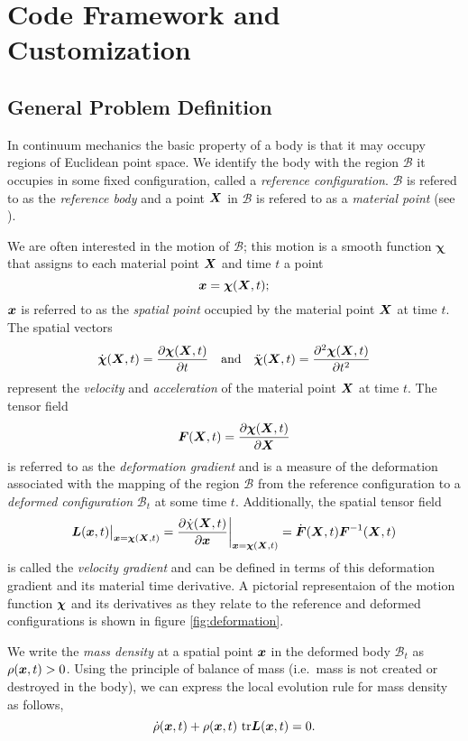 \chapter{Code Framework and Customization} \label{sec:code}
\section{General Problem Definition}
In continuum mechanics the basic property of a body is that it may occupy regions of Euclidean point space. We identify the body with the region $\mathcal{B}$ it occupies in some fixed configuration, called a \textit{reference configuration}. $\mathcal{B}$ is refered to as the \textit{reference body} and a point $\boldsymbol{X}$ in $\mathcal{B}$ is refered to as a \textit{material point} (see \cite{gurtin2010}).

We are often interested in the motion of $\mathcal{B}$; this motion is a smooth function $\boldsymbol{\chi}$ that assigns to each material point $\boldsymbol{X}$ and time $t$ a point
$$\boldsymbol{x} = \boldsymbol{\chi}(\boldsymbol{X},t);$$
$\boldsymbol{x}$ is referred to as the \textit{spatial point} occupied by the material point $\boldsymbol{X}$ at time $t$. The spatial vectors
$$\dot{\boldsymbol{\chi}}(\boldsymbol{X},t) = \frac{\partial \boldsymbol{\chi}(\boldsymbol{X},t)}{\partial t} \quad \text{and} \quad \ddot{\boldsymbol{\chi}}(\boldsymbol{X},t) = \frac{\partial^2 \boldsymbol{\chi}(\boldsymbol{X},t)}{\partial t^2}$$
represent the \textit{velocity} and \textit{acceleration} of the material point $\boldsymbol{X}$ at time $t$. The tensor field
$$\boldsymbol{F}(\boldsymbol{X},t) = \frac{\partial \boldsymbol{\chi}(\boldsymbol{X},t)}{\partial \boldsymbol{X}}$$
is referred to as the \textit{deformation gradient} and is a measure of the deformation associated with the mapping of the region $\mathcal{B}$ from the reference configuration to a \textit{deformed configuration} $\mathcal{B}_t$ at some time $t$. Additionally, the spatial tensor field
$$\boldsymbol{L}(\boldsymbol{x},t)\big|_{\boldsymbol{x}=\boldsymbol{\chi}(\boldsymbol{X},t)} = \frac{\partial \dot{\chi}(\boldsymbol{X},t)}{\partial \boldsymbol{x}}\bigg|_{\boldsymbol{x}=\boldsymbol{\chi}(\boldsymbol{X},t)}=\dot{\boldsymbol{F}}(\boldsymbol{X},t)\boldsymbol{F}^{-1}(\boldsymbol{X},t)$$
is called the \textit{velocity gradient} and can be defined in terms of this deformation gradient and its material time derivative. A pictorial representaion of the motion function $\boldsymbol{\chi}$ and its derivatives as they relate to the reference and deformed configurations is shown in figure \ref{fig:deformation}.

We write the \textit{mass density} at a spatial point $\boldsymbol{x}$ in the deformed body $\mathcal{B}_t$ as $\rho(\boldsymbol{x},t) > 0$. Using the principle of balance of mass (i.e.\ mass is not created or destroyed in the body), we can express the local evolution rule for mass density as follows,
$$\dot{\rho}(\boldsymbol{x},t) + \rho(\boldsymbol{x},t)\ \mathrm{tr}\boldsymbol{L}(\boldsymbol{x},t) = 0.$$

